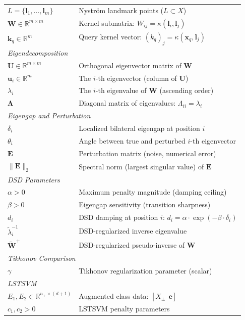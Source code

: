 \documentclass[preprint,review,12pt]{elsarticle}
\begin{document}
\begin{table}[!t]
\begin{tabular}{@{}p{1.4cm}p{6.2cm}@{}}
$L = \{\bm{l}_1, \ldots, \bm{l}_m\}$ & Nystr\"{o}m landmark points ($L \subset X$) \\
$\bm{W} \in \mathbb{R}^{m \times m}$ & Kernel submatrix: $W_{ij} = \kappa(\bm{l}_i, \bm{l}_j)$ \\
$\bm{k}_q \in \mathbb{R}^m$ & Query kernel vector: $(k_q)_j = \kappa(\bm{x}_q, \bm{l}_j)$ \\
\midrule
\multicolumn{2}{l}{\textit{Eigendecomposition}} \\
$\bm{U} \in \mathbb{R}^{m \times m}$ & Orthogonal eigenvector matrix of $\bm{W}$ \\
$\bm{u}_i \in \mathbb{R}^m$ & The $i$-th eigenvector (column of $\bm{U}$) \\
$\lambda_i$ & The $i$-th eigenvalue of $\bm{W}$ (ascending order) \\
$\bm{\Lambda}$ & Diagonal matrix of eigenvalues: $\Lambda_{ii} = \lambda_i$ \\
\midrule
\multicolumn{2}{l}{\textit{Eigengap and Perturbation}} \\
$\delta_i$ & Localized bilateral eigengap at position $i$ \\
$\theta_i$ & Angle between true and perturbed $i$-th eigenvector \\
$\bm{E}$ & Perturbation matrix (noise, numerical error) \\
$\|\bm{E}\|_2$ & Spectral norm (largest singular value) of $\bm{E}$ \\
\midrule
\multicolumn{2}{l}{\textit{DSD Parameters}} \\
$\alpha > 0$ & Maximum penalty magnitude (damping ceiling) \\
$\beta > 0$ & Eigengap sensitivity (transition sharpness) \\
$d_i$ & DSD damping at position $i$: $d_i = \alpha \cdot \exp(-\beta \cdot \delta_i)$ \\
$\tilde{\lambda}_i^{-1}$ & DSD-regularized inverse eigenvalue \\
$\tilde{\bm{W}}^+$ & DSD-regularized pseudo-inverse of $\bm{W}$ \\
\midrule
\multicolumn{2}{l}{\textit{Tikhonov Comparison}} \\
$\gamma$ & Tikhonov regularization parameter (scalar) \\
\midrule
\multicolumn{2}{l}{\textit{LSTSVM}} \\
$E_1, E_2 \in \mathbb{R}^{n_\pm \times (d+1)}$ & Augmented class data: $[X_\pm ~~ \bm{e}]$ \\
$c_1, c_2 > 0$ & LSTSVM penalty parameters \\

\end{tabular}
\end{table}
\end{document}
